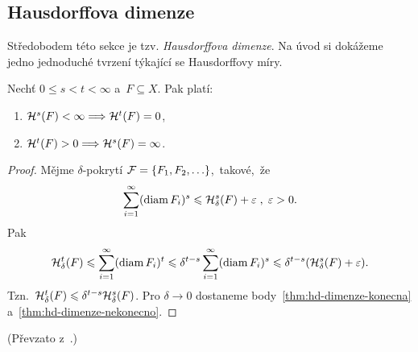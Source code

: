 \subsection{Hausdorffova dimenze}\label{subsec:hausdorffova-dimenze}

Středobodem této sekce je tzv. \emph{Hausdorffova dimenze}. Na úvod si dokážeme jedno jednoduché tvrzení týkající se Hausdorffovy míry.
\begin{theorem}\label{thm:hodnoty-hausdorffovy-miry}
    Nechť $0\leqslant s<t<\infty$ a~$F\subseteq X$. Pak platí:
    \begin{enumerate}[label=(\roman*)]
        \item\label{thm:hd-dimenze-konecna} $\mathcal{H}^{s}(F)<\infty\Longrightarrow\mathcal{H}^{t}(F)=0$,
        \item\label{thm:hd-dimenze-nekonecno} $\mathcal{H}^{t}(F)>0\Longrightarrow\mathcal{H}^{s}(F)=\infty$.
    \end{enumerate}
\end{theorem}
\begin{proof}
    Mějme $\delta$-pokrytí $\mathcal{F}=\left\{F_1,F_2,\ldots\right\}$,~takové,~že
    \[\sum_{i=1}^{\infty}(\operatorname{diam}{F_i})^s\leqslant\mathcal{H}_{\delta}^{s}(F)+\varepsilon\;,\;\varepsilon>0.\]
    Pak
    \[\mathcal{H}_{\delta}^{t}(F)\leqslant\sum_{i=1}^{\infty}(\operatorname{diam}{F_i})^t\leqslant\delta^{t-s}\sum_{i=1}^{\infty}(\operatorname{diam}{F_i})^s\leqslant\delta^{t-s}(\mathcal{H}_{\delta}^{s}(F)+\varepsilon).\]
    Tzn.~$\mathcal{H}_{\delta}^{t}(F)\leqslant\delta^{t-s}\mathcal{H}_{\delta}^{s}(F)$. Pro $\delta\to 0$ dostaneme body~\ref{thm:hd-dimenze-konecna} a~\ref{thm:hd-dimenze-nekonecno}.
\end{proof}
(Převzato z~\citep[str. 68]{Mattila1995}.)

